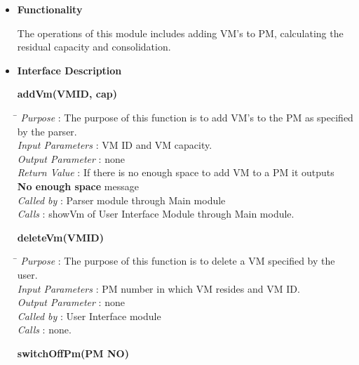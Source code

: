 \documentclass[a4paper,11pt]{article}
\begin{document}
\begin{itemize}
\item \textbf{Functionality}

The operations of this module includes adding VM's to PM, calculating the residual capacity and consolidation.

\item \textbf{Interface Description}


\textbf{addVm(VM\textunderscore ID, cap)}
  
\begin{tabbing}
\hspace*{4cm}\= \kill
 \textit{Purpose} \> : The purpose of this function is to add VM's to the PM as specified\\ \> by the parser.\\
  \textit{Input Parameters} \> : VM ID and VM capacity. \\
  \textit{Output Parameter} \> : none \\
  \textit{Return Value} \> : If there is no enough space to add VM to a PM it outputs \\ \>\textbf{No enough space} message\\
  \textit{Called by} \> : Parser module through Main module \\
  \textit{Calls} \> : showVm of User Interface Module through Main module.\\
\end{tabbing}

\textbf{deleteVm(VM\textunderscore ID)}
  
\begin{tabbing}
\hspace*{4cm}\= \kill
 \textit{Purpose} \> : The purpose of this function is to delete a VM specified by the user.\\
  \textit{Input Parameters} \> : PM number in which VM resides and VM ID. \\
  \textit{Output Parameter} \> : none \\
 \textit{Called by} \> : User Interface module \\
  \textit{Calls} \> : none.\\
\end{tabbing}
\pagebreak
\textbf{switchOffPm(PM \textunderscore NO)}
  

\end{itemize}
\end{document}
